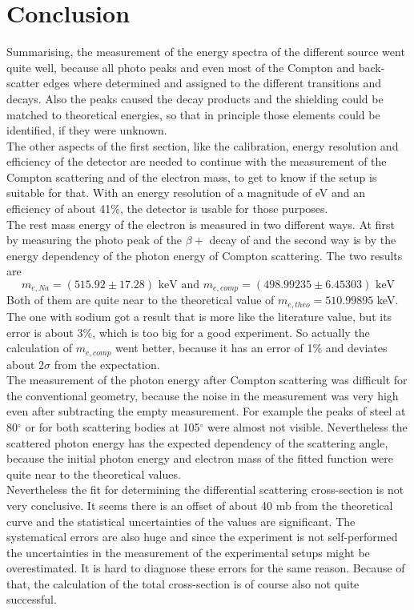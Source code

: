 \documentclass{article}
\begin{document}
\newpage
\section{Conclusion}
Summarising, the measurement of the energy spectra of the different source went quite well, because all photo peaks and even most of the Compton and back-scatter edges where determined and assigned to the different transitions and decays. Also the peaks caused the decay products and the shielding could be matched to theoretical energies, so that in principle those elements could be identified, if they were unknown.\\
The other aspects of the first section, like the calibration, energy resolution and efficiency of the detector are needed to continue with the measurement of the Compton scattering and of the electron mass, to get to know if the setup is suitable for that. With an energy resolution of a magnitude of eV and an efficiency of about 41$\%$, the detector is usable for those purposes.\\
The rest mass energy of the electron is measured in two different ways. At first by measuring the photo peak of the $\beta+$ decay of  and the second way is by the energy dependency of the photon energy of Compton scattering. The two results are
\begin{equation*}
    m_{e, Na} = (515.92 \pm 17.28)\mbox{ keV and } m_{e,comp} = (498.99235 \pm  6.45303)\mbox{ keV}
\end{equation*}
Both of them are quite near to the theoretical value of $m_{e, theo} = 510.99895$ keV. The one with sodium got a result that is more like the literature value, but its error is about 3$\%$, which is too big for a good experiment.
So actually the calculation of $m_{e,comp}$ went better, because it has an error of 1$\%$ and deviates about 2$\sigma$ from the expectation.\\
The measurement of the photon energy after Compton scattering was difficult for the conventional geometry, because the noise in the measurement was very high even after subtracting the empty measurement. For example the peaks of steel at 80$^\circ$ or for both scattering bodies at 105$^\circ$ were almost not visible. Nevertheless the scattered photon energy has the expected dependency of the scattering angle, because the initial photon energy and electron mass of the fitted function were quite near to the theoretical values.\\
Nevertheless the fit for determining the differential scattering cross-section is not very conclusive.
It seems there is an offset of about 40 mb from the theoretical curve and the statistical uncertainties of the values are significant.
The systematical errors are also huge and since the experiment is not self-performed the uncertainties in the measurement of the experimental setups might be overestimated. It is hard to diagnose these errors for the same reason.
Because of that, the calculation of the total cross-section is of course also not quite successful.
\end{document}
